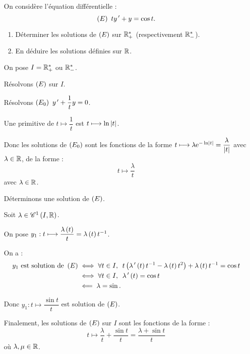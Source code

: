 \begin{exo}[Exercice 6]
On considère l'équation différentielle : \[\left(E\right)~ty^{\,\prime}+y=\cos t.\]

\begin{enumerate}
    \item Déterminer les solutions de \(\left(E\right)\) sur \(\mathbb{R}_+^*\) (respectivement \(\mathbb{R}_-^*\)). \\
    \item En déduire les solutions définies sur \(\mathbb{R}\).
\end{enumerate}
\end{exo}

\begin{corr}[1]
On pose \(I=\mathbb{R}_+^*\) ou \(\mathbb{R}_-^*\).

Résolvons \(\left(E\right)\) sur \(I\).

Résolvons \(\left(E_0\right)~y^{\,\prime}+\dfrac{1}{t}y=0\).

Une primitive de \(t\mapsto\dfrac{1}{t}\) est \(t\longmapsto\ln\left\lvert t\right\rvert\).

Donc les solutions de \(\left(E_0\right)\) sont les fonctions de la forme \(t\longmapsto\lambda\mathrm{e}^{-\ln\left\lvert t\right\rvert}=\dfrac{\lambda}{\left\lvert t\right\rvert}\) avec \(\lambda\in\mathbb{R}\), \cad de la forme : \[t\mapsto\dfrac{\lambda}{t}\] avec \(\lambda\in\mathbb{R}\).

Déterminons une solution de \(\left(E\right)\).

Soit \(\lambda\in\mathscr{C}^{1}\left(I,\mathbb{R}\right)\).

On pose \(y_1:t\longmapsto\dfrac{\lambda\left(t\right)}{t}=\lambda\left(t\right)t^{-1}\).

On a : \[\begin{aligned}
y_1\text{ est solution de }\paren{E}&\ssi\quantifs{\forall t\in I}t\paren{\lambda\prim\paren{t}t\inv-\lambda\paren{t}t^2}+\lambda\paren{t}t\inv=\cos t \\
&\ssi\quantifs{\forall t\in I}\lambda\prim\paren{t}=\cos t \\
&\impr\lambda=\sin.
\end{aligned}\]

Donc \(y_1:t\mapsto\dfrac{\sin t}{t}\) est solution de \(\left(E\right)\).

Finalement, les solutions de \(\left(E\right)\) sur \(I\) sont les fonctions de la forme : \[t\mapsto\dfrac{\lambda}{t}+\dfrac{\sin t}{t}=\dfrac{\lambda+\sin t}{t}\] où \(\lambda,\mu\in\mathbb{R}\).
\end{corr}

